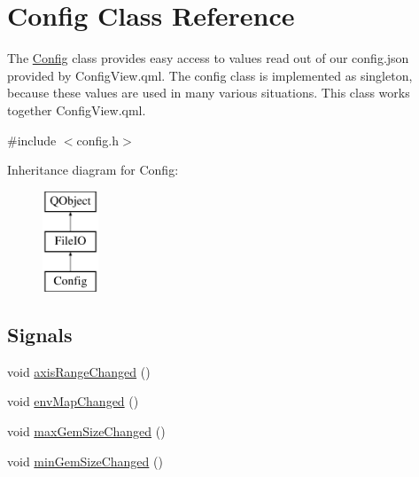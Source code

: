 \hypertarget{class_config}{\section{Config Class Reference}
\label{class_config}
}


The \hyperlink{class_config}{Config} class provides easy access to values read out of our config.\+json provided by Config\+View.\+qml.  The config class is implemented as singleton, because these values are used in many various situations. This class works together Config\+View.\+qml.  




{\ttfamily \#include $<$config.\+h$>$}

Inheritance diagram for Config\+:\begin{figure}[H]
\begin{center}
\leavevmode
\includegraphics[height=3.000000cm]{class_config}
\end{center}
\end{figure}
\subsection*{Signals}
\begin{DoxyCompactItemize}
\item 
void \hyperlink{class_config_a5681c5b14ccda37c70498b984bd706ff}{axis\+Range\+Changed} ()
\item 
void \hyperlink{class_config_a46f1b9a172d4f44882d784e6f880480e}{env\+Map\+Changed} ()
\item 
void \hyperlink{class_config_a4ef0417dbecefc3febeee33cdf93488d}{max\+Gem\+Size\+Changed} ()
\item 
void \hyperlink{class_config_a3d78af7f9a04ae58883f7f309d0f43d7}{min\+Gem\+Size\+Changed} ()
\end{DoxyCompactItemize}
